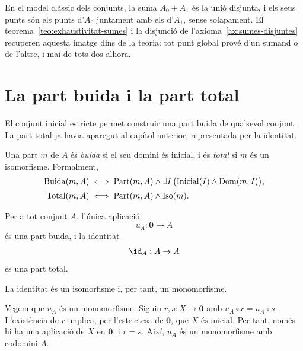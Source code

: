 \begin{observacio}\label{obs:punts-suma}
En el model clàssic dels conjunts, la suma \(A_0+A_1\) és la unió disjunta, i els seus punts són els punts d'\(A_0\) juntament amb els d'\(A_1\), sense solapament. El teorema~\ref{teo:exhaustivitat-sumes} i la disjunció de l'axioma~\ref{ax:sumes-disjuntes} recuperen aquesta imatge dins de la teoria: tot punt global prové d'un sumand o de l'altre, i mai de tots dos alhora.
\end{observacio}

\section{La part buida i la part total}\label{sec:buida-total}

El conjunt inicial estricte permet construir una part buida de qualsevol
conjunt. La part total ja havia aparegut al capítol anterior, representada
per la identitat.

\begin{definicio}\label{def:parts-extremals}
Una part \(m\) de \(A\) és \emph{buida} si el seu domini és inicial, i
és \emph{total} si \(m\) és un isomorfisme. Formalment,
\[
\begin{aligned}
\operatorname{Buida}(m,A)
&\iff
\operatorname{Part}(m,A)
\land
\exists I\,
\bigl(
\operatorname{Inicial}(I)\land\operatorname{Dom}(m,I)
\bigr),
\\[0.5ex]
\operatorname{Total}(m,A)
&\iff
\operatorname{Part}(m,A)
\land\operatorname{Iso}(m).
\end{aligned}
\]
\end{definicio}

\begin{proposicio}\label{prop:parts-extremals-existeixen}
Per a tot conjunt \(A\), l'única aplicació
\[
u_A:\mathbf0\to A
\]
és una part buida, i la identitat
\[
\id_A:A\to A
\]
és una part total.
\end{proposicio}

\begin{prova}
La identitat és un isomorfisme i, per tant, un monomorfisme.

Vegem que \(u_A\) és un monomorfisme. Siguin \(r,s:X\to\mathbf0\)
amb \(u_A\circ r=u_A\circ s\). L'existència de \(r\) implica, per
l'estrictesa de \(\mathbf0\), que \(X\) és inicial. Per tant, només hi
ha una aplicació de \(X\) en \(\mathbf0\), i \(r=s\). Així,
\(u_A\) és un monomorfisme amb codomini \(A\).
\end{prova}

